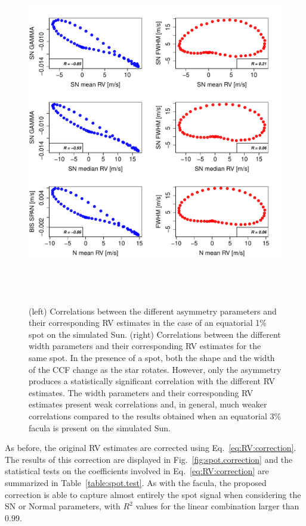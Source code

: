 \documentclass{aa}
\begin{document}
\begin{figure}[htbp]
\begin{center}
\includegraphics[height = 6in]{SOAP_SPOT_Comparison_para_SN.pdf} 
   \caption{(left) Correlations between the different asymmetry parameters and their corresponding RV estimates in the case of an equatorial 1\% spot on the simulated Sun. (right) Correlations between the different width parameters and their corresponding RV estimates for the same spot. In the presence of a spot, both the shape and the width of the CCF change as the star rotates. However, only the asymmetry produces a statistically significant correlation with the different RV estimates. The width parameters and their corresponding RV estimates present weak correlations and, in general, much weaker correlations compared to the results obtained when an equatorial 3\% facula is present on the simulated Sun.}
    \label{fig:spot.corr}
\end{center}
\end{figure}

As before, the original RV estimates are corrected using Eq.~\eqref{eq:RV:correction}. 
The results of this correction are displayed in Fig.~\ref{fig:spot.correction} and the statistical tests on the coefficients involved in Eq.~\eqref{eq:RV:correction} are summarized in Table~\ref{table:spot.test}. 
As with the facula, the proposed correction is able to capture almost entirely the spot signal when considering the SN or Normal parameters, with $R^2$ values for the linear combination larger than 0.99. 
\end{document}
